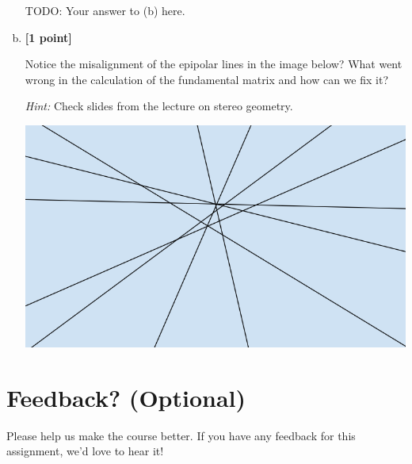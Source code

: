 \begin{enumerate}[(a)]
\begin{tcolorbox}[colback=white!5!white,colframe=green!75!black]
{{    TODO: Your answer to (b) here.

    }}
\end{tcolorbox}

\item \textbf{[1 point]} 
\begin{tcolorbox}[colback=orange!5!white,colframe=orange!75!black]


Notice the misalignment of the epipolar lines in the image below? What went wrong in the calculation of the fundamental matrix and how can we fix it?

\textit{Hint:} Check slides from the lecture on stereo geometry.
\end{tcolorbox}

\includegraphics[width = 0.5\linewidth]{images/epipolarlines-c.PNG}
\end{enumerate}



\pagebreak
\section*{Feedback? (Optional)}
Please help us make the course better. If you have any feedback for this assignment, we'd love to hear it!




